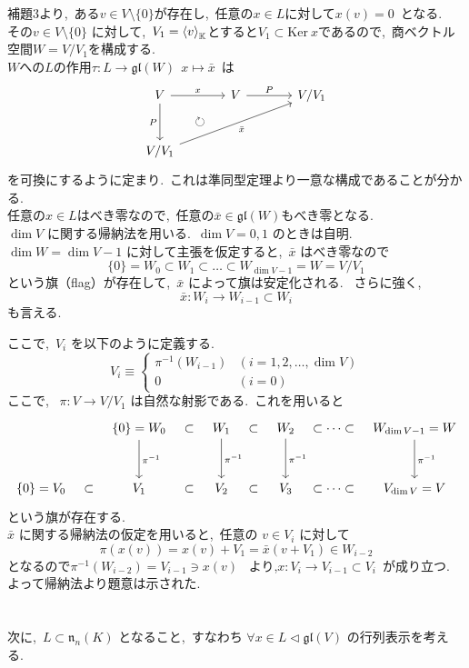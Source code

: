 \documentclass[uplatex,dvipdfmx]{jsarticle}
\begin{document}
\begin{myproof}
補題3より,~ある$v \in V\setminus\{0\}$が存在し,~任意の$x\in L$に対して$x(v)=0$~となる.\\
その$v\in V\setminus\{0\}$ に対して,~$V_1 = \ev{v}_{\mathbb{K}}$とすると$V_1\subset \text{Ker}~ x$であるので,~商ベクトル空間$W=V/V_1$を構成する.\\
$W$への$L$の作用$\tau :L\to \mathfrak{gl}(W)~~x\mapsto \bar{x}$~は
\[
\begin{tikzcd}[row sep=large, column sep=large]
    V \arrow[r, "x"] \arrow[d, "P"'] & V \arrow[r, "P"] \arrow[dl, phantom, "\circlearrowright"] & V/V_1 \\
    V/V_1 \arrow[rru, "\bar{x}"'] & &
\end{tikzcd}
\]
を可換にするように定まり.~これは準同型定理より一意な構成であることが分かる.\\
任意の$x\in L $はべき零なので,~任意の$\bar{x}\in \mathfrak{gl}(W)$もべき零となる.\\
$\dim V$ に関する帰納法を用いる.~$\dim V = 0, 1$ のときは自明.\\
$\dim W = \dim V - 1$ に対して主張を仮定すると,~$\bar{x}$ はべき零なので
\[
\{0\} = W_0 \subset W_1 \subset \dots \subset W_{\dim V - 1} = W = V/V_1
\]
という旗（flag）が存在して,~$\bar{x}$ によって旗は安定化される.~
さらに強く,
\[
\bar{x} : W_i \to W_{i-1} \subset W_i
\]
も言える.~

ここで,~$V_i$ を以下のように定義する.~
\[
V_i \equiv
\begin{cases}
\pi^{-1}(W_{i-1}) & (i = 1, 2, \dots, \dim V) \\
0 & (i = 0)
\end{cases}
\]
ここで,~ $\pi : V \to V/V_1$ は自然な射影である.~これを用いると
\[
\begin{tikzcd}[column sep=0.3em, row sep=3em]
    & & \{0\} = W_0 \arrow[d, "\pi^{-1}"] & \;\subset\; & W_1 \arrow[d, "\pi^{-1}"] & \;\subset\; & W_2 \arrow[d, "\pi^{-1}"] & \;\subset \cdots \subset\; & W_{\dim V - 1} = W \arrow[d, "\pi^{-1}"] \\
    \{0\} = V_0 & \;\subset\; & V_1 & \;\subset\; & V_2 & \;\subset\; & V_3 & \subset \cdots \subset & V_{\dim V} = V
\end{tikzcd}
\]
という旗が存在する.\\
$\bar{x}$ に関する帰納法の仮定を用いると,~任意の $v \in V_i$ に対して
\[
\pi(x(v)) = x(v) + V_1 = \bar{x}(v + V_1) \in W_{i-2}
\]
となるので$\pi^{-1}(W_{i-2}) = V_{i-1} \ni x(v)$~
より,$x : V_i \to V_{i-1} \subset V_i$~が成り立つ.\\
よって帰納法より題意は示された.\\\\\\
次に,~$L \subset \mathfrak{n}_n(K)$ となること,~すなわち $\forall x \in L \triangleleft \mathfrak{gl}(V)$ の行列表示を考える.~


\end{myproof}
\end{document}
